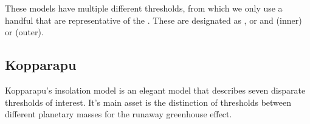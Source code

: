 \documentclass[letterpaper,10pt,english]{sphinxmanual}
\begin{document}
\sphinxAtStartPar
These models have multiple different thresholds, from which
we only use a handful that are representative of the {\hyperref[\detokenize{quantities/habitability/habitable_zones/habitable_zones:id1}]{}}.
These are designated as ,  or  and  (inner) or  (outer).


\subsection{Kopparapu}
\label{\detokenize{quantities/insolation_models/kopparapu/kopparapu:kopparapu}}\label{\detokenize{quantities/insolation_models/kopparapu/kopparapu::doc}}\label{\detokenize{quantities/insolation_models/kopparapu/kopparapu:kopparapu-insolation-model}}
\sphinxAtStartPar
Kopparapu’s insolation model is an elegant model that describes seven
disparate thresholds of interest.
It’s main asset is the distinction of thresholds between different planetary
masses for the runaway greenhouse effect.
\end{document}
